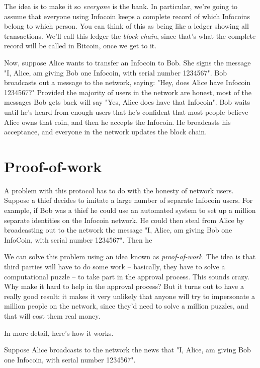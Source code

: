 \documentclass[12pt]{book}
\newcounter{problem}[chapter]
\newcounter{example}[chapter]
\begin{document}
The idea is to make it so \emph{everyone} is the bank.  In particular,
we're going to assume that everyone using Infocoin keeps a complete
record of which Infocoins belong to which person.  You can think of
this as being like a ledger showing all transactions.  We'll call this
ledger the \emph{block chain}, since that's what the complete record
will be called in Bitcoin, once we get to it.

Now, suppose Alice wants to transfer an Infocoin to Bob.  She signs
the message "I, Alice, am giving Bob one Infocoin, with serial number
1234567".  Bob broadcasts out a message to the network, saying: "Hey,
does Alice have Infocoin 1234567?"  Provided the majority of users in
the network are honest, most of the messages Bob gets back will say
"Yes, Alice does have that Infocoin".  Bob waits until he's heard from
enough users that he's confident that most people believe Alice owns
that coin, and then he accepts the Infocoin.  He broadcasts his
acceptance, and everyone in the network updates the block chain.

\section{Proof-of-work}

A problem with this protocol has to do with the honesty of network
users.  Suppose a thief decides to imitate a large number of separate
Infocoin users.  For example, if Bob was a thief he could use an
automated system to set up a million separate identities on the
Infocoin network.  He could then steal from Alice by broadcasting out
to the network the message "I, Alice, am giving Bob one InfoCoin, with
serial number 1234567".  Then he

We can solve this problem using an idea known as \emph{proof-of-work}.
The idea is that third parties will have to do some work -- basically,
they have to solve a computational puzzle -- to take part in the
approval process.  This sounds crazy.  Why make it hard to help in the
approval process?  But it turns out to have a really good result: it
makes it very unlikely that anyone will try to impersonate a million
people on the network, since they'd need to solve a million puzzles,
and that will cost them real money.

In more detail, here's how it works.

Suppose Alice broadcasts to the network the news that "I, Alice, am
giving Bob one Infocoin, with serial number 1234567".  
\end{document}
